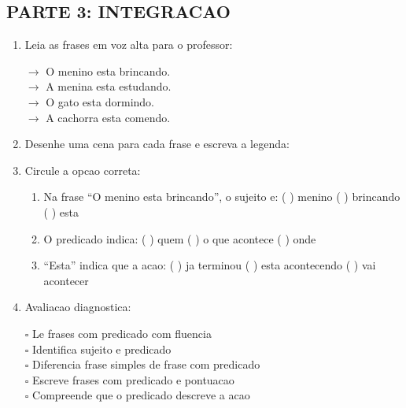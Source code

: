 \begin{exercicio}
\subsection*{PARTE 3: INTEGRACAO}

\begin{enumerate}[resume]
  \item Leia as frases em voz alta para o professor:
  \begin{center}
  $\rightarrow$ O menino esta brincando.\\
  $\rightarrow$ A menina esta estudando.\\
  $\rightarrow$ O gato esta dormindo.\\
  $\rightarrow$ A cachorra esta comendo.
  \end{center}

  \item Desenhe uma cena para cada frase e escreva a legenda:
  \begin{center}
  \end{center}

  \item Circule a opcao correta:
  \begin{enumerate}[label=(\alph*)]
    \item Na frase ``O menino esta brincando'', o sujeito e: ( ) menino ( ) brincando ( ) esta
    \item O predicado indica: ( ) quem ( ) o que acontece ( ) onde
    \item ``Esta'' indica que a acao: ( ) ja terminou ( ) esta acontecendo ( ) vai acontecer
  \end{enumerate}

  \item Avaliacao diagnostica:
  \begin{center}
  $\square$ Le frases com predicado com fluencia\\
  $\square$ Identifica sujeito e predicado\\
  $\square$ Diferencia frase simples de frase com predicado\\
  $\square$ Escreve frases com predicado e pontuacao\\
  $\square$ Compreende que o predicado descreve a acao
  \end{center}


\end{enumerate}
\end{exercicio}
